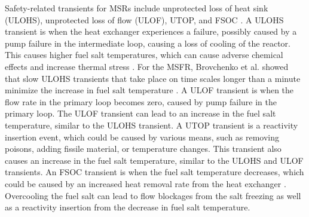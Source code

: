 Safety-related transients for \glspl{MSR} include unprotected loss of heat sink (ULOHS), unprotected loss of flow (ULOF), \gls{UTOP}, and \gls{FSOC} \cite{li2015transient, daher2022improvement}.
A \gls{ULOHS} transient is when the heat exchanger experiences a failure, possibly caused by a pump failure in the intermediate loop, causing a loss of cooling of the reactor.
This causes higher fuel salt temperatures, which can cause adverse chemical effects and increase thermal stress \cite{belles2020proposed}.
For the \gls{MSFR}, Brovchenko et al. showed that slow \gls{ULOHS} transients that take place on time scales longer than a minute minimize the increase in fuel salt temperature \cite{brovchenko2013design}.
A \gls{ULOF} transient is when the flow rate in the primary loop becomes zero, caused by pump failure in the primary loop.
The \gls{ULOF} transient can lead to an increase in the fuel salt temperature, similar to the \gls{ULOHS} transient.
A \gls{UTOP} transient is a reactivity insertion event, which could be caused by various means, such as removing poisons, adding fissile material, or temperature changes.
This transient also causes an increase in the fuel salt temperature, similar to the \gls{ULOHS} and \gls{ULOF} transients.
An \gls{FSOC} transient is when the fuel salt temperature decreases, which could be caused by an increased heat removal rate from the heat exchanger \cite{belles2020proposed}.
Overcooling the fuel salt can lead to flow blockages from the salt freezing as well as a reactivity insertion from the decrease in fuel salt temperature.


